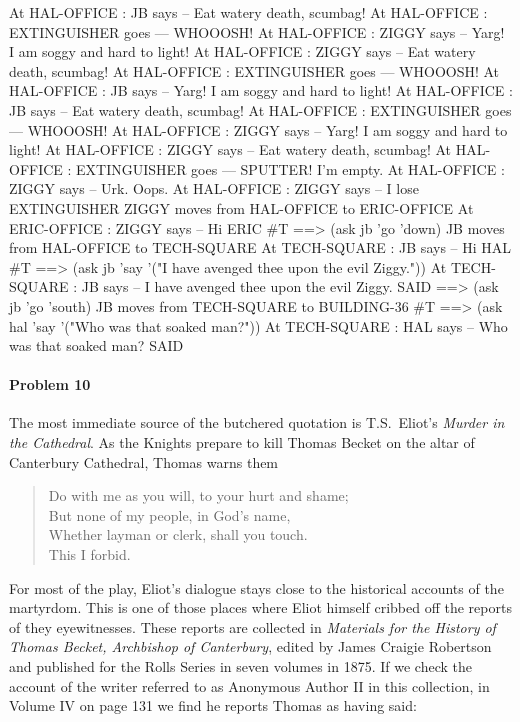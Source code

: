 At HAL-OFFICE : JB says -- Eat watery death, scumbag! 
At HAL-OFFICE : EXTINGUISHER goes --- WHOOOSH! 
At HAL-OFFICE : ZIGGY says -- Yarg!  I am soggy and hard to light! 
At HAL-OFFICE : ZIGGY says -- Eat watery death, scumbag! 
At HAL-OFFICE : EXTINGUISHER goes --- WHOOOSH! 
At HAL-OFFICE : JB says -- Yarg!  I am soggy and hard to light! 
At HAL-OFFICE : JB says -- Eat watery death, scumbag! 
At HAL-OFFICE : EXTINGUISHER goes --- WHOOOSH! 
At HAL-OFFICE : ZIGGY says -- Yarg!  I am soggy and hard to light! 
At HAL-OFFICE : ZIGGY says -- Eat watery death, scumbag! 
At HAL-OFFICE : EXTINGUISHER goes --- SPUTTER! I'm empty. 
At HAL-OFFICE : ZIGGY says -- Urk.  Oops. 
At HAL-OFFICE : ZIGGY says -- I lose EXTINGUISHER 
ZIGGY moves from HAL-OFFICE to ERIC-OFFICE 
At ERIC-OFFICE : ZIGGY says -- Hi ERIC 
\#T
\null
\endlisp
\beginlisp
==> (ask jb 'go 'down)
JB moves from HAL-OFFICE to TECH-SQUARE 
At TECH-SQUARE : JB says -- Hi HAL 
\#T
\null
==> (ask jb 'say '("I have avenged thee upon the evil Ziggy."))
At TECH-SQUARE : JB says -- I have avenged thee upon the evil Ziggy. 
SAID
\null
==> (ask jb 'go 'south)
JB moves from TECH-SQUARE to BUILDING-36 
\#T
\null
==> (ask hal 'say '("Who was that soaked man?"))
At TECH-SQUARE : HAL says -- Who was that soaked man? 
SAID
\endlisp

\paragraph{Problem 10}  The most immediate source of the butchered
quotation is T.S.~Eliot's {\em Murder in the Cathedral}.  As the
Knights prepare to kill Thomas Becket on the altar of 
Canterbury Cathedral, Thomas warns them
\begin{verse}
Do with me as you will, to your hurt and shame; \\
But none of my people, in God's name, \\
Whether layman or clerk, shall you touch. \\
This I forbid.
\end{verse}

For most of the play, Eliot's dialogue stays close to the historical
accounts of the martyrdom.  This is one of those places where Eliot
himself cribbed off the reports of they eyewitnesses.  These reports
are collected in {\em Materials for the History of Thomas Becket,
Archbishop of Canterbury}, edited by James Craigie Robertson and
published for the Rolls Series in seven volumes in 1875.  If we check
the account of the writer referred to as Anonymous Author II in this
collection, in Volume IV on page 131 we find he reports Thomas as having said:

